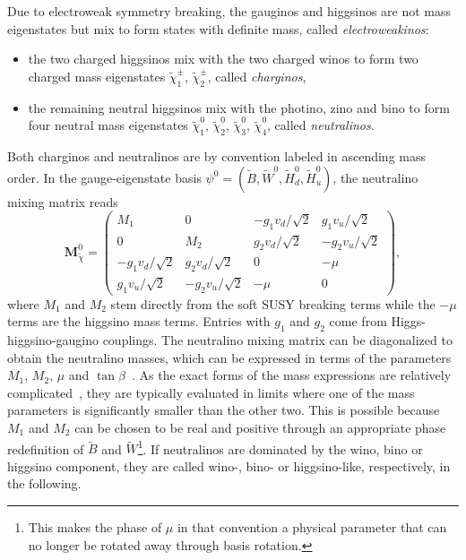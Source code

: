 Due to electroweak symmetry breaking, the gauginos and higgsinos are not mass eigenstates but mix to form states with definite mass, called \textit{electroweakinos}: 
\begin{itemize}
	\item the two charged higgsinos mix with the two charged winos to form two charged mass eigenstates $\tilde{\chi}_1^\pm$, $\tilde{\chi}_2^\pm$, called \textit{charginos},
	\item the remaining neutral higgsinos mix with the photino, zino and bino to form four neutral mass eigenstates $\tilde{\chi}_1^0$, $\tilde{\chi}_2^0$, $\tilde{\chi}_3^0$, $\tilde{\chi}_4^0$, called \textit{neutralinos}.
\end{itemize}
Both charginos and neutralinos are by convention labeled in ascending mass order. In the gauge-eigenstate basis $\psi^0 = (\tilde{B},\tilde{W}^0,\tilde{H}^0_d,\tilde{H}^0_u)$, the neutralino mixing matrix reads~\cite{Martin:1997ns}
\begin{equation}
	\boldsymbol{M}_{\tilde{\chi}}^0 = 	\begin{pmatrix}
		M_1 & 0 & -g_1v_d/\sqrt{2} & g_1 v_u/\sqrt{2} \\
		0 & M_2 & g_2 v_d/\sqrt{2} & - g_2 v_u/\sqrt{2} \\
		- g_1 v_d/\sqrt{2} & g_2 v_d/\sqrt{2} & 0 & -\mu \\
		g_1 v_u/\sqrt{2} & -g_2 v_u/\sqrt{2} & -\mu & 0
	\end{pmatrix},
	\label{eq:neutralino_mixing}
\end{equation}
where $M_1$ and $M_2$ stem directly from the soft SUSY breaking terms while the $-\mu$ terms are the higgsino mass terms. Entries with $g_1$ and $g_2$ come from Higgs-higgsino-gaugino couplings. The neutralino mixing matrix can be diagonalized to obtain the neutralino masses, which can be expressed in terms of the parameters $M_1$, $M_2$, $\mu$ and $\tan{\beta}$~\cite{Martin:1997ns}. As the exact forms of the mass expressions are relatively complicated~\cite{pdg2020}, they are typically evaluated in limits where one of the mass parameters is significantly smaller than the other two. This is possible because $M_1$ and $M_2$ can be chosen to be real and positive through an appropriate phase redefinition of $\tilde{B}$ and $\tilde{W}$\footnote{This makes the phase of $\mu$ in that convention a physical parameter that can no longer be rotated away through basis rotation.}. If neutralinos are dominated by the wino, bino or higgsino component, they are called wino-, bino- or higgsino-like, respectively, in the following.

